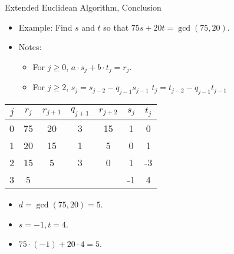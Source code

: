 \documentclass{beamer}
\begin{document}
\begin{frame}{Extended Euclidean Algorithm, Conclusion}

\begin{itemize}
  \item Example: Find $s$ and $t$ so that $75s+20t = \gcd(75, 20)$.
  \item Notes:
  \begin{itemize}
    \item For $j\geq0$, $a \cdot s_j + b \cdot t_j = r_j$.
    \item For $j\geq 2$, $s_j=s_{j-2} - q_{j-1}s_{j-1}$ \quad $t_j=t_{j-2} - q_{j-1}t_{j-1}$
  \end{itemize}
\end{itemize}

\vspace{1em}

\begin{tabular}{|c|c|c|c|c|c|c|}\hline
$j$   &  $r_{j}$    & $r_{j+1}$ & $q_{j+1}$ & $r_{j+2}$ & $s_j$ & $t_j$ \\ \hline\hline
0     &  75         &  20       &    3      &   15      &  1    &   0   \\ \hline
1     &  20         &  15       &    1      &    5      &  0    &   1   \\ \hline
2     &  15         &   5       &    3      &    0      &  1    &  -3   \\ \hline
3     &   5         &           &           &           & -1    &   4   \\ \hline
\end{tabular}

\begin{itemize}
  \item $d = \gcd(75, 20) = 5$.
  \item $s=-1, t=4$.
  \item $75\cdot(-1) + 20 \cdot 4 = 5$.
\end{itemize}

\end{frame}
\end{document}
